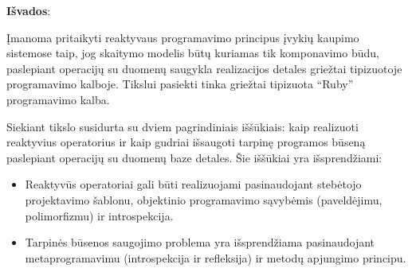 \documentclass{VUMIFPSmagistrinis}
\begin{document}
\textbf{Išvados}:

Įmanoma pritaikyti reaktyvaus programavimo principus įvykių kaupimo sistemose taip, jog skaitymo modelis būtų kuriamas tik komponavimo būdu, paslepiant operacijų su duomenų saugykla realizacijos detales griežtai tipizuotoje programavimo kalboje. Tikslui pasiekti tinka griežtai tipizuota ``Ruby'' programavimo kalba.

Siekiant tikslo susidurta su dviem pagrindiniais iššūkiais: kaip realizuoti reaktyvius operatorius ir kaip gudriai išsaugoti tarpinę programos būseną paslepiant operacijų su duomenų baze detales. Šie iššūkiai yra išsprendžiami:

\begin{itemize}
  \item Reaktyvūs operatoriai gali būti realizuojami pasinaudojant stebėtojo projektavimo šablonu, objektinio programavimo sąvybėmis (paveldėjimu, polimorfizmu) ir introspekcija.
  \item Tarpinės būsenos saugojimo problema yra išsprendžiama pasinaudojant metaprogramavimu (introspekcija ir refleksija) ir metodų apjungimo principu.
\end{itemize}

\printbibliography[heading=bibintoc]  %




\end{document}
